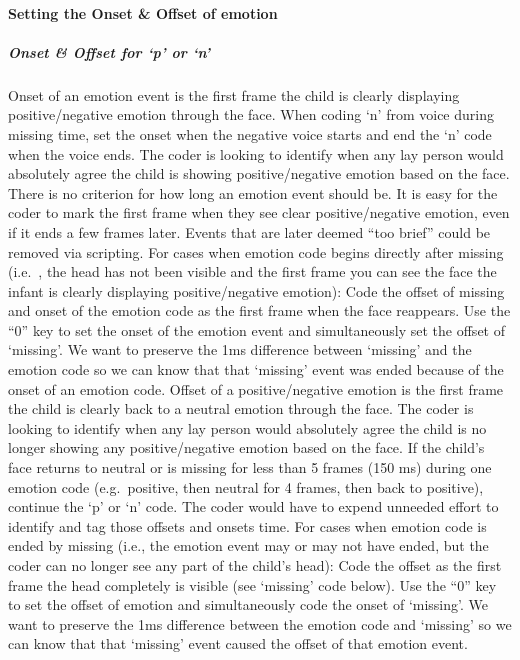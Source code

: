 \documentclass[
  12pt,
]{book}
\begin{document}
\hypertarget{setting-the-onset-offset-of-emotion}{%
\paragraph*{Setting the Onset \& Offset of emotion}\label{setting-the-onset-offset-of-emotion}}

\hypertarget{onset-offset-for-p-or-n}{%
\subparagraph*{Onset \& Offset for `p' or `n'}\label{onset-offset-for-p-or-n}}

Onset of an emotion event is the first frame the child is clearly displaying positive/negative emotion through the face. When coding `n' from voice during missing time, set the onset when the negative voice starts and end the `n' code when the voice ends. The coder is looking to identify when any lay person would absolutely agree the child is showing positive/negative emotion based on the face.
There is no criterion for how long an emotion event should be. It is easy for the coder to mark the first frame when they see clear positive/negative emotion, even if it ends a few frames later. Events that are later deemed ``too brief'' could be removed via scripting.
For cases when emotion code begins directly after missing (i.e.~, the head has not been visible and the first frame you can see the face the infant is clearly displaying positive/negative emotion): Code the offset of missing and onset of the emotion code as the first frame when the face reappears. Use the ``0'' key to set the onset of the emotion event and simultaneously set the offset of `missing'. We want to preserve the 1ms difference between `missing' and the emotion code so we can know that that `missing' event was ended because of the onset of an emotion code.
Offset of a positive/negative emotion is the first frame the child is clearly back to a neutral emotion through the face. The coder is looking to identify when any lay person would absolutely agree the child is no longer showing any positive/negative emotion based on the face.
If the child's face returns to neutral or is missing for less than 5 frames (150 ms) during one emotion code (e.g.~positive, then neutral for 4 frames, then back to positive), continue the `p' or `n' code. The coder would have to expend unneeded effort to identify and tag those offsets and onsets time.
For cases when emotion code is ended by missing (i.e., the emotion event may or may not have ended, but the coder can no longer see any part of the child's head): Code the offset as the first frame the head completely is visible (see `missing' code below). Use the ``0'' key to set the offset of emotion and simultaneously code the onset of `missing'. We want to preserve the 1ms difference between the emotion code and `missing' so we can know that that `missing' event caused the offset of that emotion event.
\end{document}
